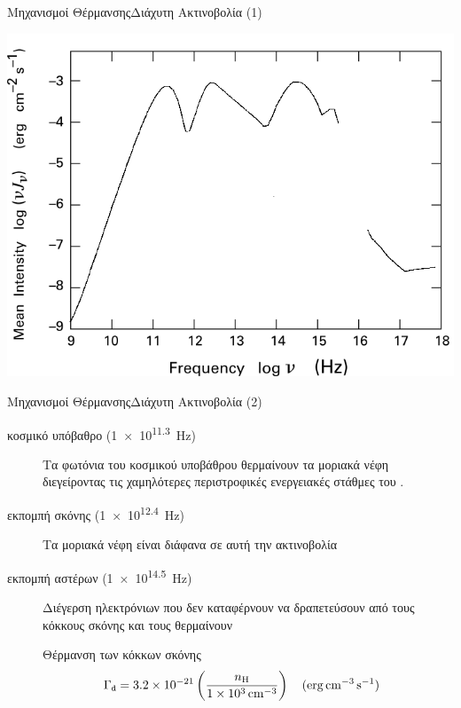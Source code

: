 \documentclass{beamer}
\begin{document}
\begin{frame}{Μηχανισμοί Θέρμανσης}{Διάχυτη Ακτινοβολία (1)}
	\begin{center}
			\includegraphics[width=0.7\linewidth]{../Document/Images/interstellarradiation}
	\end{center}
\end{frame}

\begin{frame}{Μηχανισμοί Θέρμανσης}{Διάχυτη Ακτινοβολία (2)}
	\begin{description}
		\item[κοσμικό υπόβαθρο (\SI{1e11.3}{Hz})]{Τα φωτόνια του κοσμικού υποβάθρου θερμαίνουν τα μοριακά νέφη διεγείροντας τις χαμηλότερες περιστροφικές ενεργειακές στάθμες του .}
		\item[εκπομπή σκόνης (\SI{1e12.4}{Hz})]{Τα μοριακά νέφη είναι διάφανα σε αυτή την ακτινοβολία}
		\item[εκπομπή αστέρων (\SI{1e14.5}{Hz})]{Διέγερση ηλεκτρόνιων που δεν καταφέρνουν να δραπετεύσουν από τους κόκκους σκόνης και τους θερμαίνουν}
		 \begin{block}{Θέρμανση των κόκκων σκόνης}
		 	\begin{equation}
		 	\Gamma _\mathtt{d} = \num{3.2e-21} \left( \frac{n_{\ce{H}}}{\SI{1e3}{cm^{-3}}} \right) \qq{(\si{erg.cm^{-3}.s^{-1}})} 
		 	\end{equation} 	
		 \end{block}	
	\end{description}
\end{frame}
\end{document}
